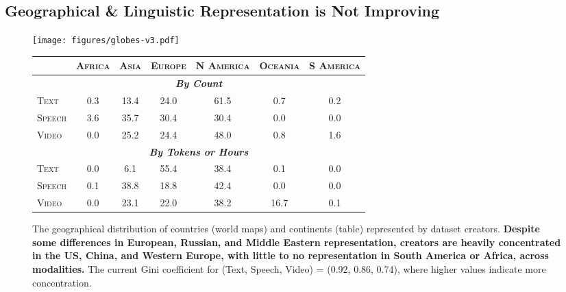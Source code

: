 \subsection{Geographical \& Linguistic Representation is Not Improving}
\label{sec:representation}

\begin{figure}[!ht]
  \centering
  \begin{minipage}{0.99\textwidth}
    \centering
    \texttt{[image: figures/globes-v3.pdf]}
  \end{minipage}\hfill
  \begin{minipage}{0.99\textwidth}
    \centering
    \begin{tabular}{l|cccccc}
        \toprule
         & \textsc{Africa} & \textsc{Asia} & \textsc{Europe} & \textsc{N America} & \textsc{Oceania} & \textsc{S America} \\
        \midrule
        \multicolumn{7}{c}{\textbf{\emph{By Count}}} \\
        \midrule
        \textsc{Text} & 0.3 & 13.4 & 24.0 & 61.5 & 0.7 & 0.2 \\
        \textsc{Speech} & 3.6 & 35.7 & 30.4 & 30.4 & 0.0 & 0.0 \\
        \textsc{Video} & 0.0 & 25.2 & 24.4 & 48.0 & 0.8 & 1.6 \\
        \midrule
        \multicolumn{7}{c}{\textbf{\emph{By Tokens or Hours}}} \\
        \midrule
        \textsc{Text} & 0.0 & 6.1 & 55.4 & 38.4 & 0.1 & 0.0 \\
        \textsc{Speech} & 0.1 & 38.8 & 18.8 & 42.4 & 0.0 & 0.0 \\
        \textsc{Video} & 0.0 & 23.1 & 22.0 & 38.2 & 16.7 & 0.1 \\
        \bottomrule
    \end{tabular}
  \end{minipage}
  \vspace{1mm}
  \caption{The geographical distribution of countries (world maps) and continents (table) represented by dataset creators. \textbf{Despite some differences in European, Russian, and Middle Eastern representation, creators are heavily concentrated in the US, China, and  Western Europe, with little to no representation in South America or Africa, across modalities.} The current Gini coefficient for (Text, Speech, Video) = (0.92, 0.86, 0.74), where higher values indicate more concentration.}
  \label{fig:creator-worldmaps}
  \vspace{-3mm}
\end{figure}

